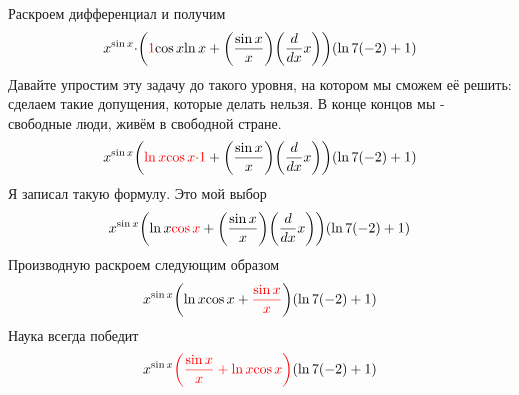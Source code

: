 \documentclass{article}
\begin{document}
\begin{center}
Раскроем дифференциал и получим\begin{gather*}
{{{x}^{\sin{{x}}}}{\cdot}{{\left({{\color{red}{{1}}}{{\cos{{x}}}{\ln{{x}}}}}+{{\left(\frac{{\sin{{x}}}}{{x}}\right)}{\left({\frac{{d}}{{d{{x}}}}}{{x}}\right)}}\right)}{\left({{\ln{{7}}}{\left(-{2}\right)}}+{1}\right)}}}\end{gather*}
Давайте упростим эту задачу до такого уровня, на котором мы сможем её решить: сделаем такие допущения, которые делать нельзя. В конце концов мы - свободные люди, живём в свободной стране.\begin{gather*}
{{{x}^{\sin{{x}}}}{{\left({\color{red}{{{\ln{{x}}}{{\cos{{x}}}{\cdot}{1}}}}}+{{\left(\frac{{\sin{{x}}}}{{x}}\right)}{\left({\frac{{d}}{{d{{x}}}}}{{x}}\right)}}\right)}{\left({{\ln{{7}}}{\left(-{2}\right)}}+{1}\right)}}}\end{gather*}
Я записал такую формулу. Это мой выбор\begin{gather*}
{{{x}^{\sin{{x}}}}{{\left({{\ln{{x}}}{\color{red}{{\cos{{x}}}}}}+{{\left(\frac{{\sin{{x}}}}{{x}}\right)}{\left({\frac{{d}}{{d{{x}}}}}{{x}}\right)}}\right)}{\left({{\ln{{7}}}{\left(-{2}\right)}}+{1}\right)}}}\end{gather*}
Производную раскроем следующим образом\begin{gather*}
{{{x}^{\sin{{x}}}}{{\left({{\ln{{x}}}{\cos{{x}}}}+{\color{red}{{\frac{{\sin{{x}}}}{{x}}}}}\right)}{\left({{\ln{{7}}}{\left(-{2}\right)}}+{1}\right)}}}\end{gather*}
Наука всегда победит\begin{gather*}
{{{x}^{\sin{{x}}}}{{\color{red}{{\left({\frac{{\sin{{x}}}}{{x}}}+{{\ln{{x}}}{\cos{{x}}}}\right)}}}{\left({{\ln{{7}}}{\left(-{2}\right)}}+{1}\right)}}}\end{gather*}

\end{center}
\end{document}
